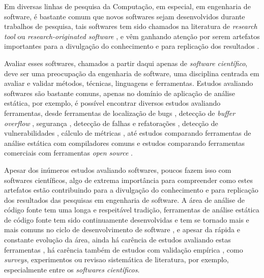
Em diversas linhas de pesquisa da Computação, em especial, em engenharia de
software, é bastante comum que novos softwares sejam desenvolvidos durante
trabalhos de pesquisa, tais softwares tem sido chamados na literatura de {\it
research tool} \cite{Portillo12} ou {\it research-originated software}
\cite{Kon2011}, e vêm ganhando atenção por serem artefatos importantes para a
divulgação do conhecimento e para replicação dos resultados \cite{Stodden2009}.

Avaliar esses softwares, chamados a partir daqui apenas de {\it software
científico}, deve ser uma preocupação da engenharia de software, uma disciplina
centrada em avaliar e validar métodos, técnicas, linguagens e ferramentas.
Estudos avaliando softwares são bastante comuns, apenas no domínio
de aplicação de análise estática, por exemplo, é possível encontrar diversos estudos
avaliando ferramentas, desde ferramentas de localização de bugs \cite{Rutar2004}, detecção
de {\it buffer overflow} \cite{Kratkiewicz2005}, segurança \cite{Okun2007,
Johns2011}, detecção de falhas e refatorações \cite{Wedyan2009}, detecção de
vulnerabilidades \cite{Li2010, Ataide2014}, cálculo de métricas
\cite{Alemerien2013}, até estudos comparando ferramentas de análise estática
com compiladores comuns \cite{Emanuelsson2008} e estudos comparando ferramentas
comerciais com ferramentas {\it open source} \cite{Al2010}.


Apesar dos inúmeros estudos avaliando softwares, poucos fazem isso com
softwares científicos, algo de extrema importância para compreender como estes
artefatos estão contribuindo para a divulgação do conhecimento e para
replicação dos resultados das pesquisas em engenharia de software. A área de
análise de código fonte tem uma longa e respeitável tradição, ferramentas de
análise estática de código fonte tem sido continuamente desenvolvidas e tem se
tornado mais e mais comuns no ciclo de desenvolvimento de software
\cite{Novak2010}, e apesar da rápida e constante evolução da área, ainda há
carência de estudos avaliando estas ferramentas \cite{Li2010}, há carência
também de estudos com validação empírica \cite{ilyas2016static}, como {\it
surveys}, experimentos ou revisao sistemática de literatura, por exemplo, especialmente entre
os {\it softwares científicos}.

